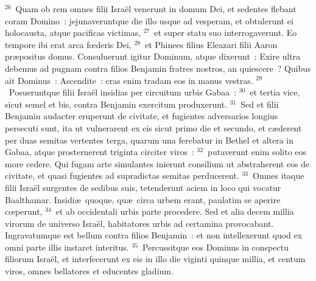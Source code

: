 ${}^{26}$~Quam ob rem omnes filii Isra\"el venerunt in domum Dei, et sedentes flebant coram Domino~: jejunaveruntque die illo usque ad vesperam, et obtulerunt ei holocausta, atque pacificas victimas,
${}^{27}$~et super statu suo interrogaverunt. Eo tempore ibi erat arca fœderis Dei,
${}^{28}$~et Phinees filius Eleazari filii Aaron pr\ae positus domus. Consuluerunt igitur Dominum, atque dixerunt~: Exire ultra debemus ad pugnam contra filios Benjamin fratres nostros, an quiescere~? Quibus ait Dominus~: Ascendite~: cras enim tradam eos in manus vestras.
${}^{29}$~Posueruntque filii Isra\"el insidias per circuitum urbis Gabaa~:
${}^{30}$~et tertia vice, sicut semel et bis, contra Benjamin exercitum produxerunt.
${}^{31}$~Sed et filii Benjamin audacter eruperunt de civitate, et fugientes adversarios longius persecuti sunt, ita ut vulnerarent ex eis sicut primo die et secundo, et c\ae derent per duas semitas vertentes terga, quarum una ferebatur in Bethel et altera in Gabaa, atque prosternerent triginta circiter viros~:
${}^{32}$~putaverunt enim solito eos more cedere. Qui fugam arte simulantes inierunt consilium ut abstraherent eos de civitate, et quasi fugientes ad supradictas semitas perducerent.
${}^{33}$~Omnes itaque filii Isra\"el surgentes de sedibus suis, tetenderunt aciem in loco qui vocatur Baalthamar. Insidi\ae\ quoque, qu\ae\ circa urbem erant, paulatim se aperire cœperunt,
${}^{34}$~et ab occidentali urbis parte procedere. Sed et alia decem millia virorum de universo Isra\"el, habitatores urbis ad certamina provocabant. Ingravatumque est bellum contra filios Benjamin~: et non intellexerunt quod ex omni parte illis instaret interitus.
${}^{35}$~Percussitque eos Dominus in conspectu filiorum Isra\"el, et interfecerunt ex eis in illo die viginti quinque millia, et centum viros, omnes bellatores et educentes gladium.



